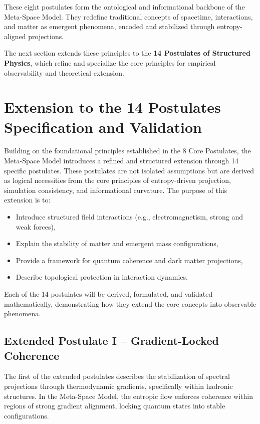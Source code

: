 \documentclass[10.5pt,a4paper]{article}
\begin{document}
These eight postulates form the ontological and informational backbone of the Meta-Space Model. They redefine traditional concepts of spacetime, interactions, and matter as emergent phenomena, encoded and stabilized through entropy-aligned projections.

The next section extends these principles to the \textbf{14 Postulates of Structured Physics}, which refine and specialize the core principles for empirical observability and theoretical extension.

\clearpage

\section{Extension to the 14 Postulates – Specification and Validation}

Building on the foundational principles established in the 8 Core Postulates, the Meta-Space Model introduces 
a refined and structured extension through 14 specific postulates. These postulates are not isolated assumptions 
but are derived as logical necessities from the core principles of entropy-driven projection, simulation consistency, 
and informational curvature. The purpose of this extension is to:
\begin{itemize}
    \item Introduce structured field interactions (e.g., electromagnetism, strong and weak forces),
    \item Explain the stability of matter and emergent mass configurations,
    \item Provide a framework for quantum coherence and dark matter projections,
    \item Describe topological protection in interaction dynamics.
\end{itemize}
Each of the 14 postulates will be derived, formulated, and validated mathematically, demonstrating how 
they extend the core concepts into observable phenomena.

\subsection{Extended Postulate I – Gradient-Locked Coherence}

The first of the extended postulates describes the stabilization of spectral projections through thermodynamic gradients, 
specifically within hadronic structures. In the Meta-Space Model, the entropic flow enforces coherence within regions of 
strong gradient alignment, locking quantum states into stable configurations.
\end{document}
